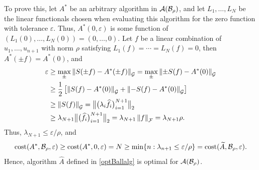 \documentclass[graybox,footinfo]{svmult}
\newcommand{\DHJRnorm}[2][{}]{\ensuremath{\left \lVert #2 \right \rVert}_{#1}}
\newcommand{\DHJRbignorm}[2][{}]{\ensuremath{\bigl \lVert #2 \bigr \rVert}_{#1}}
\begin{document}
To prove this, let $A^*$ be an arbitrary algorithm in ${\mathcal{A}}({\mathcal{B}}_{\rho})$, and let $L_1, \ldots, L_N$ be the linear functionals chosen when evaluating this algorithm for the zero function with tolerance $\varepsilon$.  Thus, $A^*(0,\varepsilon)$ is some function of $(L_1(0) , \ldots, L_N(0)) = (0, \ldots, 0)$.  Let $f$ be a linear combination of $u_1, \ldots, u_{n+1}$ with norm $\rho$ satisfying  $L_1(f) = \cdots = L_N(f) = 0$, then $A^*(\pm f) = A^*(0)$, and
\begin{align*}
\varepsilon & \ge \max_{\pm} \DHJRnorm[\calG]{S(\pm f) - A^*(\pm f)} =  \max_{\pm} \DHJRnorm[\calG]{\pm S( f) - A^*(0)} \\
& \ge \frac 12 \left [ \DHJRnorm[\calG]{S( f) - A^*(0)} + \DHJRnorm[\calG]{- S( f) - A^*(0)}\right] \\
& \ge \DHJRnorm[\calG]{S(f)} 
= \DHJRbignorm[2]{\big(\lambda_i\widehat{f}_i\big)_{i=1}^{N+1}} \\
& \ge \lambda_{N+1} \DHJRbignorm[2]{\big(\widehat{f}_i\big)_{i=1}^{N+1}} = \lambda_{N+1} \DHJRnorm[\calF]{f} = \lambda_{N+1} \rho.
\end{align*}
Thus, $\lambda_{N+1} \le \varepsilon/\rho$, and 
\[
\textup{cost}(A^*,{\mathcal{B}}_\rho,\varepsilon) \ge \textup{cost}(A^*,0,\varepsilon)  = N \ge \min\{ n : \lambda_{n+1} \le \varepsilon/\rho \} = \textup{cost}(\widetilde{A},{\mathcal{B}}_\rho,\varepsilon).
\]
Hence, algorithm $\widehat{A}$ defined in \eqref{optBallalg} is optimal for ${\mathcal{A}}({\mathcal{B}}_{\rho})$.
\end{document}
